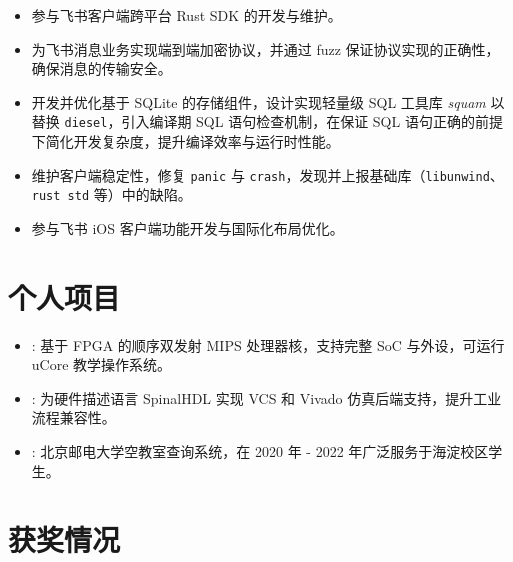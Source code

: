 \documentclass{resume}
\begin{document}
\begin{itemize}
      \item 参与飞书客户端跨平台 Rust SDK 的开发与维护。
      \item 为飞书消息业务实现端到端加密协议，并通过 fuzz 保证协议实现的正确性，确保消息的传输安全。
      \item 开发并优化基于 SQLite 的存储组件，设计实现轻量级 SQL 工具库 \textit{squam} 以替换 \texttt{diesel}，引入编译期 SQL 语句检查机制，在保证 SQL 语句正确的前提下简化开发复杂度，提升编译效率与运行时性能。
      \item 维护客户端稳定性，修复 \texttt{panic} 与 \texttt{crash}，发现并上报基础库（\texttt{libunwind}、\texttt{rust std} 等）中的缺陷。
\end{itemize}

\begin{itemize}
      \item 参与飞书 iOS 客户端功能开发与国际化布局优化。
\end{itemize}

\section{个人项目}
\begin{itemize}[parsep=0.25ex]
      \item {}:
            基于 FPGA 的顺序双发射 MIPS 处理器核，支持完整 SoC 与外设，可运行 uCore 教学操作系统。
      \item {}:
            为硬件描述语言 SpinalHDL 实现 VCS 和 Vivado 仿真后端支持，提升工业流程兼容性。
      \item {}:
            北京邮电大学空教室查询系统，在 2020 年 - 2022 年广泛服务于海淀校区学生。
\end{itemize}

\section{获奖情况}

\end{document}
